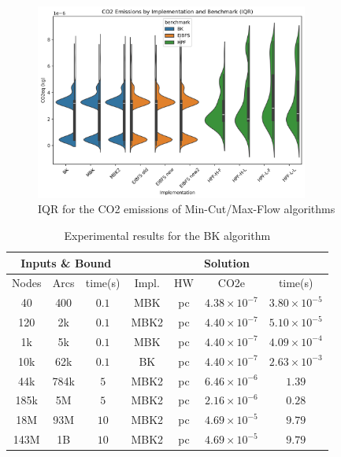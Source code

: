 \documentclass[a4paper,singleside,12pt]{report} %
\begin{document}
\begin{figure}[h!]
    \centering
    \includegraphics[width=0.8\textwidth]{imgs/max_flow_emissions_iqr.png}
    \caption{IQR for the CO2 emissions of Min-Cut/Max-Flow algorithms}
    \label{fig:max_flow_emissions_iqr}
\end{figure}

\begin{table}[h!]
    \centering
    \begin{tabular}{|ccc|cccc|}
        \hline
        \multicolumn{3}{|c|}{Inputs \& Bound} & \multicolumn{4}{c|}{Solution} \\
        \hline
        Nodes & Arcs & time(s) & Impl. & HW & CO2e & time(s) \\
        \hline
        40 & 400 & $0.1$ & MBK & pc & $4.38 \times 10^{-7}$ & $3.80 \times 10^{-5}$ \\
        120 & 2k & $0.1$ & MBK2 & pc & $4.40 \times 10^{-7}$ & $5.10 \times 10^{-5}$ \\
        1k & 5k & $0.1$ & MBK & pc & $4.40 \times 10^{-7}$ & $4.09 \times 10^{-4}$ \\
        10k & 62k & $0.1$ & BK & pc & $4.40 \times 10^{-7}$ & $2.63 \times 10^{-3}$ \\
        44k & 784k & $5$ & MBK2 & pc & $6.46 \times 10^{-6}$ & $1.39$ \\
        185k & 5M & $5$ & MBK2 & pc & $2.16 \times 10^{-6}$ & $0.28$ \\
        18M & 93M & $10$ & MBK2 & pc & $4.69 \times 10^{-5}$& $9.79$ \\
        143M & 1B & $10$ & MBK2 & pc & $4.69 \times 10^{-5}$ & $9.79$ \\
        \hline
    \end{tabular}
    \caption{Experimental results for the BK algorithm}
    \label{tab:bk_results}
\end{table}
\end{document}
